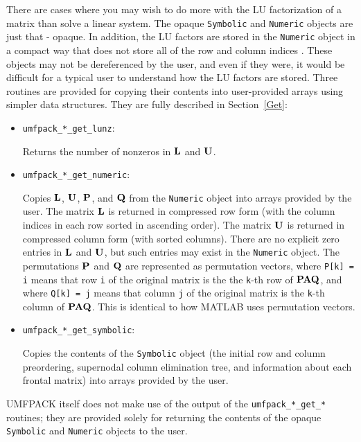 There are cases where you may wish to do more with the LU factorization
of a matrix than solve a linear system.  The opaque {\tt Symbolic} and
{\tt Numeric} objects are just that - opaque.  In addition, the LU factors
are stored in the {\tt Numeric} object in a compact way that does not store
all of the row and column indices \cite{GeorgeLiu}.  These objects may not be
dereferenced by the user, and even if they were, it would be difficult for a
typical user to understand how the LU factors are stored.  Three routines
are provided for copying their contents into user-provided arrays using simpler
data structures.  They are fully described in Section~\ref{Get}:

\begin{itemize}
\item {\tt umfpack\_*\_get\_lunz}:

    Returns the number of nonzeros in ${\bf{L}}$ and ${\bf{U}}$.

\item {\tt umfpack\_*\_get\_numeric}:

    Copies ${\bf{L}}$, ${\bf{U}}$, ${\bf{P}}$, and ${\bf{Q}}$ from the {\tt Numeric} object
    into arrays provided by the user.  The matrix ${\bf{L}}$ is returned in
    compressed row form (with the column indices in each row sorted in ascending
    order).  The matrix ${\bf{U}}$ is returned in compressed column form (with
    sorted columns).  There are no explicit zero entries in ${\bf{L}}$ and ${\bf{U}}$,
    but such entries may exist in the {\tt Numeric} object.  The permutations
    ${\bf{P}}$ and ${\bf{Q}}$ are represented as permutation vectors, where
    {\tt P[k] = i} means that row {\tt i} of the original matrix is the
    the {\tt k}-th row of ${\bf{PAQ}}$, and where
    {\tt Q[k] = j} means that column {\tt j} of the original matrix is the
    {\tt k}-th column of ${\bf{PAQ}}$.  This is identical to how MATLAB uses
    permutation vectors.

\item {\tt umfpack\_*\_get\_symbolic}:

    Copies the contents of the {\tt Symbolic} object (the initial row and column
    preordering, supernodal column elimination tree, and information
    about each frontal matrix) into arrays provided by the user.

\end{itemize}

UMFPACK itself does not make use of the output of the {\tt umfpack\_*\_get\_*}
routines; they are provided solely for returning the contents of the opaque
{\tt Symbolic} and {\tt Numeric} objects to the user.

